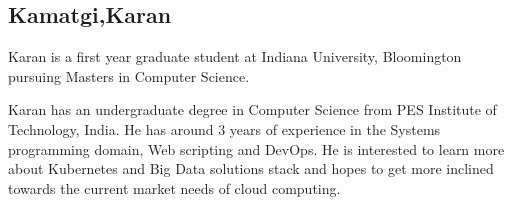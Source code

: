 
\subsection{Kamatgi,Karan}

Karan is a first year graduate student at Indiana University, Bloomington 
pursuing Masters in Computer Science. 

Karan has an undergraduate degree in Computer Science from PES Institute of 
Technology, India. 
He has around 3 years of experience in the Systems programming domain,
Web scripting and DevOps.
He is interested to learn more about Kubernetes and Big Data solutions 
stack and hopes to get more inclined towards the current market needs of cloud 
computing.


